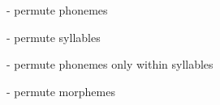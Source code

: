 - permute phonemes

- permute syllables

- permute phonemes only within syllables

- permute morphemes

